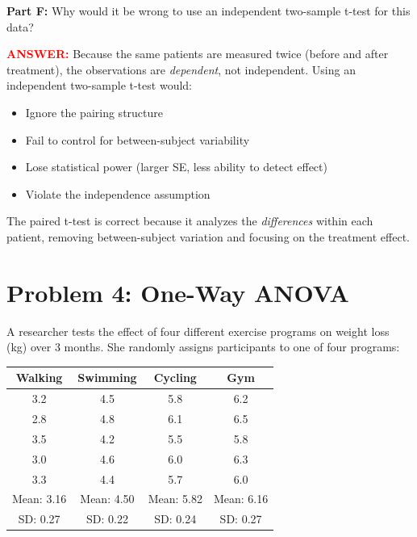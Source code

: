 \documentclass[11pt]{article}
\begin{document}
\vspace{0.5cm}

\textbf{Part F:} Why would it be wrong to use an independent two-sample t-test for this data?

\textcolor{red}{\textbf{ANSWER:}} Because the same patients are measured twice (before and after treatment), the observations are \textit{dependent}, not independent. Using an independent two-sample t-test would:
\begin{itemize}
\item Ignore the pairing structure
\item Fail to control for between-subject variability
\item Lose statistical power (larger SE, less ability to detect effect)
\item Violate the independence assumption
\end{itemize}

The paired t-test is correct because it analyzes the \textit{differences} within each patient, removing between-subject variation and focusing on the treatment effect.

\newpage

\section{Problem 4: One-Way ANOVA}

A researcher tests the effect of four different exercise programs on weight loss (kg) over 3 months. She randomly assigns participants to one of four programs:

\vspace{0.3cm}

\begin{center}
\begin{tabular}{cccc}
\toprule
Walking & Swimming & Cycling & Gym \\
\midrule
3.2 & 4.5 & 5.8 & 6.2 \\
2.8 & 4.8 & 6.1 & 6.5 \\
3.5 & 4.2 & 5.5 & 5.8 \\
3.0 & 4.6 & 6.0 & 6.3 \\
3.3 & 4.4 & 5.7 & 6.0 \\
\midrule
Mean: 3.16 & Mean: 4.50 & Mean: 5.82 & Mean: 6.16 \\
SD: 0.27 & SD: 0.22 & SD: 0.24 & SD: 0.27 \\
\bottomrule
\end{tabular}
\end{center}
\end{document}
